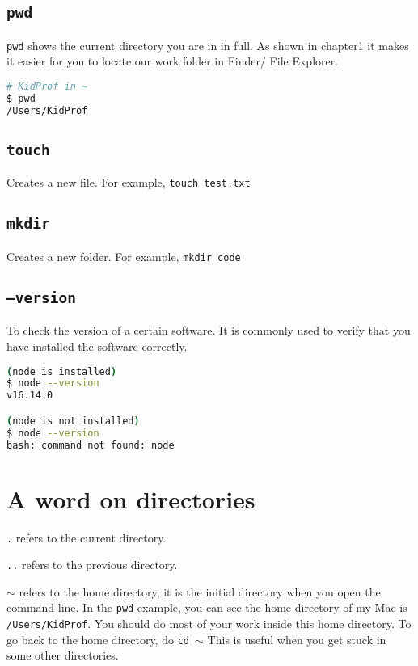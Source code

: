 \subsection{\texttt{pwd}}

\texttt{pwd} shows the current directory you are in in full. As shown in chapter1 it makes it easier for you to locate our work folder in Finder/ File Explorer.

\begin{lstlisting}[language=bash]
# KidProf in ~
$ pwd
/Users/KidProf
\end{lstlisting}

\subsection{\texttt{touch}}

Creates a new file. For example, \texttt{touch test.txt}

\subsection{\texttt{mkdir}}

Creates a new folder. For example, \texttt{mkdir code}

\subsection{\texttt{--version}}

To check the version of a certain software. It is commonly used to verify that you have installed the software correctly. 

\begin{lstlisting}[language=bash]
(node is installed)
$ node --version
v16.14.0

(node is not installed)
$ node --version
bash: command not found: node
\end{lstlisting}

\section{A word on directories}

\texttt{.} refers to the current directory.

\texttt{..} refers to the previous directory.

\texttt{$\sim$} refers to the home directory, it is the initial directory when you open the command line. In the \texttt{pwd} example, you can see the home directory of my Mac is \texttt{/Users/KidProf}. You should do most of your work inside this home directory. To go back to the home directory, do \texttt{cd $\sim$} This is useful when you get stuck in some other directories.

